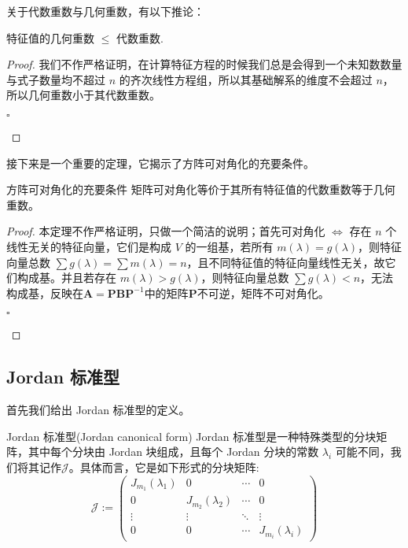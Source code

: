 关于代数重数与几何重数，有以下推论：

\begin{corollary}
	特征值的几何重数 $\leq$ 代数重数.
\end{corollary}

\begin{proof}
	我们不作严格证明，在计算特征方程的时候我们总是会得到一个未知数数量与式子数量均不超过 $n$ 的齐次线性方程组，所以其基础解系的维度不会超过 $n$，所以几何重数小于其代数重数。
	\begin{flushright}
		$\square$
	\end{flushright}
\end{proof}

接下来是一个重要的定理，它揭示了方阵可对角化的充要条件。

\begin{theorem}{方阵可对角化的充要条件}
	\label{the:candiag}
	矩阵可对角化等价于其所有特征值的代数重数等于几何重数。
\end{theorem}

\begin{proof}
	本定理不作严格证明，只做一个简洁的说明；首先可对角化 $\iff$ 存在 $n$ 个线性无关的特征向量，它们是构成 $V$ 的一组基，若所有 $m(\lambda) = g(\lambda)$，则特征向量总数 $\sum g(\lambda) = \sum m(\lambda) = n$，且不同特征值的特征向量线性无关，故它们构成基。并且若存在 $m(\lambda) > g(\lambda)$，则特征向量总数 $\sum g(\lambda) < n$，无法构成基，反映在$\mathbf{A}=\mathbf{P}\mathbf{B}\mathbf{P}^{-1}$中的矩阵$\mathbf{P}$不可逆，矩阵不可对角化。
	\begin{flushright}
		$\square$
	\end{flushright}
\end{proof}

\subsection{Jordan 标准型}

首先我们给出 Jordan 标准型的定义。

\begin{definition}{Jordan 标准型(Jordan canonical form)}
	Jordan 标准型是一种特殊类型的分块矩阵，其中每个分块由 Jordan 块组成，且每个 Jordan 分块的常数 $\lambda_i$ 可能不同，我们将其记作$\mathscr{J}$。具体而言，它是如下形式的分块矩阵:
	$$\mathscr{J}:=\begin{pmatrix}
		J_{m_1}(\lambda_1) & 0 & \cdots & 0\\
		0 & J_{m_2}(\lambda_2) & \cdots &0 \\
		\vdots & \vdots & \ddots & \vdots\\
		0 & 0 & \cdots &J_{m_i}(\lambda_i)
		\end{pmatrix}$$
\end{definition}

